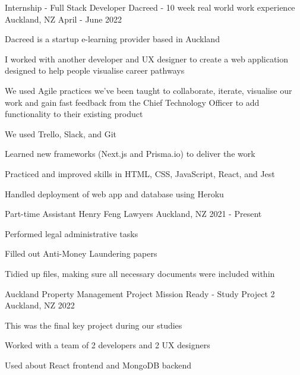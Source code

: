 

\begin{cventries}
\cventry
{Internship - Full Stack Developer} %
{Dacreed - 10 week real world work experience} %
{Auckland, NZ} %
{April - June 2022} %
{
  \begin{cvitems} %
    \item {Dacreed is a startup e-learning provider based in Auckland}
    \item {I worked with another developer and UX designer to create a web application designed to help people visualise career pathways}
    \item {We used Agile practices we've been taught to collaborate, iterate, visualise our work and gain fast feedback from the Chief Technology Officer to add functionality to their existing product}
    \item {We used Trello, Slack, and Git}
    \item {Learned new frameworks (Next.js and Prisma.io) to deliver the work}
    \item {Practiced and improved skills in HTML, CSS, JavaScript, React, and Jest}
    \item {Handled deployment of web app and database using Heroku}
  \end{cvitems}
}

\cventry
{Part-time Assistant} %
{Henry Feng Lawyers} %
{Auckland, NZ} %
{2021 - Present} %
{
  \begin{cvitems} %
    \item {Performed legal administrative tasks}
    \item {Filled out Anti-Money Laundering papers}
    \item {Tidied up files, making sure all necessary documents were included within}
  \end{cvitems}
}

\cventry
{Auckland Property Management Project} %
{Mission Ready - Study Project 2} %
{Auckland, NZ} %
{2022} %
{
  \begin{cvitems} %
    \item {This was the final key project during our studies}
    \item {Worked with a team of 2 developers and 2 UX designers}
    \item {Used about React frontend and MongoDB backend}
  \end{cvitems}
}


\end{cventries}
